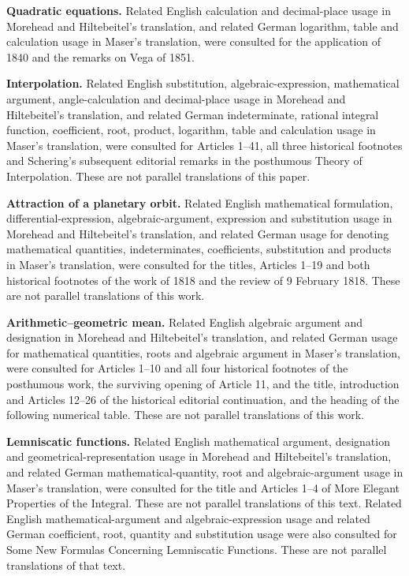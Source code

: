 \par\medskip\textbf{Quadratic equations.} Related English calculation and decimal-place usage in Morehead and Hiltebeitel’s translation, and related German logarithm, table and calculation usage in Maser’s translation, were consulted for the application of 1840 and the remarks on Vega of 1851.
\par\medskip\textbf{Interpolation.} Related English substitution, algebraic-expression, mathematical argument, angle-calculation and decimal-place usage in Morehead and Hiltebeitel’s translation, and related German indeterminate, rational integral function, coefficient, root, product, logarithm, table and calculation usage in Maser’s translation, were consulted for Articles 1–41, all three historical footnotes and Schering’s subsequent editorial remarks in the posthumous Theory of Interpolation. These are not parallel translations of this paper.
\par\medskip\textbf{Attraction of a planetary orbit.} Related English mathematical formulation, differential-expression, algebraic-argument, expression and substitution usage in Morehead and Hiltebeitel’s translation, and related German usage for denoting mathematical quantities, indeterminates, coefficients, substitution and products in Maser’s translation, were consulted for the titles, Articles 1–19 and both historical footnotes of the work of 1818 and the review of 9 February 1818. These are not parallel translations of this work.
\par\medskip\textbf{Arithmetic–geometric mean.} Related English algebraic argument and designation in Morehead and Hiltebeitel’s translation, and related German usage for mathematical quantities, roots and algebraic argument in Maser’s translation, were consulted for Articles 1–10 and all four historical footnotes of the posthumous work, the surviving opening of Article 11, and the title, introduction and Articles 12–26 of the historical editorial continuation, and the heading of the following numerical table. These are not parallel translations of this work.
\par\medskip\textbf{Lemniscatic functions.} Related English mathematical argument, designation and geometrical-representation usage in Morehead and Hiltebeitel’s translation, and related German mathematical-quantity, root and algebraic-argument usage in Maser’s translation, were consulted for the title and Articles 1–4 of More Elegant Properties of the Integral. These are not parallel translations of this text.
 Related English mathematical-argument and algebraic-expression usage and related German coefficient, root, quantity and substitution usage were also consulted for Some New Formulas Concerning Lemniscatic Functions. These are not parallel translations of that text.
